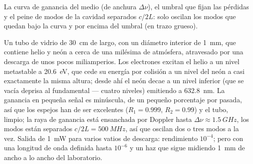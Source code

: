 \begin{omfigure}

{\small La curva de ganancia del medio (de anchura $\Delta\nu$), el umbral
que fijan las pérdidas y el peine de modos de la cavidad separados $c/2L$: solo
oscilan los modos que quedan bajo la curva y por encima del umbral (en trazo grueso).}
\end{omfigure}

\begin{example}\label{ex:b2:laser:hene}
Un tubo de vidrio de \qty{30}{cm} de largo, con un diámetro interior de \qty{1}{mm}, que contiene helio y
neón a cerca de una milésima de atmósfera, atravesado por una descarga de
unos pocos miliamperios. Los electrones excitan el helio a un nivel metastable a
\qty{20.6}{eV}, que cede su energía por colisión a un nivel del neón a
casi exactamente la misma altura; desde ahí el neón decae a un nivel inferior
(que se vacía deprisa al fundamental --- cuatro niveles) emitiendo a
\qty{632.8}{nm}. La ganancia en pequeña señal es minúscula, de un pequeño porcentaje por
pasada, así que los espejos han de ser excelentes ($R_1 = 0.999$, $R_2 = 0.99$)
y el tubo, limpio; la raya de ganancia está ensanchada por Doppler hasta
$\Delta\nu \approx \qty{1.5}{GHz}$, los modos están separados $c/2L = \qty{500}{MHz}$,
así que oscilan dos o tres modos a la vez. Salida de \qty{1}{mW} para
varios vatios de descarga: rendimiento $10^{-4}$; pero con una longitud de onda
definida hasta $10^{-6}$ y un haz que sigue midiendo \qty{1}{mm} de ancho a lo ancho del
laboratorio.
\end{example}

